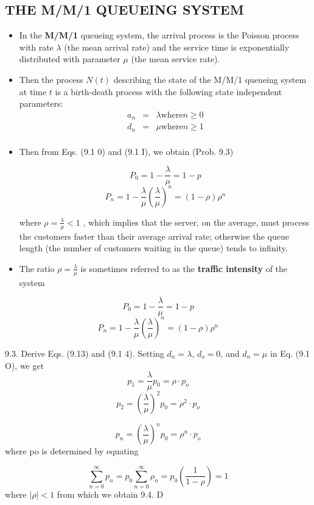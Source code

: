 




\usepackage{vmargin}
\setmargins{2.0cm}{2.5cm}{16 cm}{22cm}{0.5cm}{0cm}{1cm}{1cm}
\renewcommand{\baselinestretch}{1.3}

\setcounter{MaxMatrixCols}{10}


\large 
\subsection*{THE M/M/1 QUEUEING SYSTEM }

\begin{itemize}
    \item In the \textbf{M/M/1} queueing system, the arrival process is the Poisson process with rate $\lambda$ (the mean 
arrival rate) and the service time is exponentially distributed with parameter $\mu$ (the mean service rate). 
\item Then the process $N(t)$ describing the state of the M/M/1 queueing system at time $t$ is a birth-death 
process with the following state independent parameters:
\begin{eqnarray*}
a_n &=& \lambda \mbox{where} n\geq 0\\
d_n &=& \mu   \mbox{where} n\geq 1\\
\end{eqnarray*}
\item Then from Eqs. (9.1 0) and (9.1 I), we obtain (Prob. 9.3) 

\[ P_{0} = 1 - \frac{\lambda}{\mu} = 1-p\]
\[ P_{n} = 1 - \frac{\lambda}{\mu}\left(\frac{\lambda}{\mu}\right)^{n} = (1-\rho)\rho^{n} \]


where ${\rho = \frac{\lambda}{\mu} < 1}$ , which implies that the server, on the average, must process the customers faster 
than their average arrival rate; otherwise the queue length (the number of customers waiting in the 
queue) tends to infinity. 
\item The ratio ${\rho = \frac{\lambda}{\mu} }$ is sometimes referred to as the \textbf{traffic intensity} of the system
\end{itemize}

\newpage 
\[ P_{0} = 1 - \frac{\lambda}{\mu} = 1-p\]
\[ P_{n} = 1 - \frac{\lambda}{\mu}\left(\frac{\lambda}{\mu}\right)^{n} = (1-\rho)\rho^{n} \]

9.3. Derive Eqs. (9.13) and (9.1 4). 
Setting $d_n = \lambda$, $d_o = 0$, and $d_n = \mu$ in Eq. (9.1 O), we get 
\[p_{1}= \frac{\lambda}{\mu} p_{0} = \rho\cdot p_{o} \]
\[p_{2}= \left(\frac{\lambda}{\mu} \right)^{2}p_{0} = \rho^{2}\cdot p_{o} \]

\[p_{n}= \left(\frac{\lambda}{\mu} \right)^{n}p_{0} = \rho^{n}\cdot p_{o} \]
where po is determined by equating 

\[\sum^{\infty}_{n=0}p_{n} = p_{0}\sum^{\infty}_{n=0}\rho_{n} = p_{0}\left(\frac{1}{1-\rho} \right) = 1 \] where $\mid\rho\mid < 1 $
from which we obtain 
9.4. D


